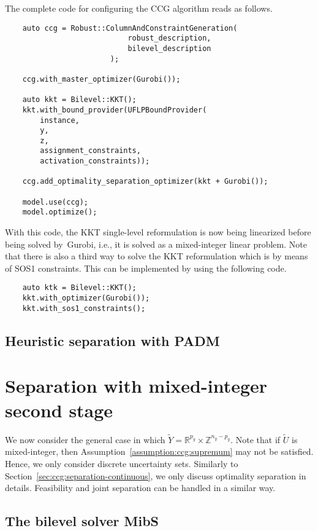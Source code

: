 The complete code for configuring the CCG algorithm reads as follows.
\begin{lstlisting}
    auto ccg = Robust::ColumnAndConstraintGeneration(
                            robust_description,
                            bilevel_description
                        );
    
    ccg.with_master_optimizer(Gurobi());

    auto kkt = Bilevel::KKT();
    kkt.with_bound_provider(UFLPBoundProvider(
        instance,
        y,
        z,
        assignment_constraints,
        activation_constraints));

    ccg.add_optimality_separation_optimizer(kkt + Gurobi());

    model.use(ccg);
    model.optimize();
\end{lstlisting}

With this code, the KKT single-level reformulation is now being linearized
before being solved by~\textsf{Gurobi}, i.e., it is solved as a mixed-integer
linear problem. Note that there is also a third way to solve the KKT
reformulation which is by means of SOS1 constraints. This can be implemented
by using the following code.
%
\begin{lstlisting}
    auto ktk = Bilevel::KKT();
    kkt.with_optimizer(Gurobi());
    kkt.with_sos1_constraints();   
\end{lstlisting}

\subsection{Heuristic separation with PADM}


\section{Separation with mixed-integer second stage}

We now consider the general case in which $\tilde{Y} =
\mathbb{R}^{p_y}\times\mathbb{Z}^{n_y - p_y}$. Note that if $\tilde{U}$ is
mixed-integer, then Assumption~\ref{assumption:ccg:supremum} may not be
satisfied. Hence, we only consider discrete uncertainty sets. Similarly to
Section~\ref{sec:ccg:separation-continuous}, we only discuss optimality
separation in details. Feasibility and joint separation can be handled in a
similar way.

\subsection{The bilevel solver \textsf{MibS}}

